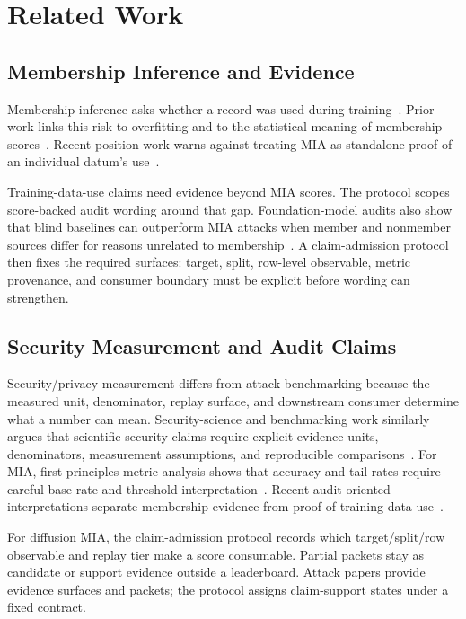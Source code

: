 \documentclass[10pt,conference]{IEEEtran}
\begin{document}
\section{Related Work}

\subsection{Membership Inference and Evidence}

Membership inference asks whether a record was used during training~\cite{shokri2017membership}.
Prior work links this risk to overfitting and to the statistical meaning of
membership scores~\cite{yeom2018privacy,carlini2022firstprinciples}. Recent
position work warns against treating MIA as standalone proof of an individual
datum's use~\cite{zhang2025cannotprove}.

Training-data-use claims need evidence beyond MIA scores. The protocol scopes
score-backed audit wording around that gap.
Foundation-model audits
also show that blind baselines can outperform MIA attacks when member and
nonmember sources differ for reasons unrelated to membership~\cite{das2025blind}.
A claim-admission protocol then fixes the required surfaces: target, split,
row-level observable, metric provenance, and consumer boundary must be explicit
before wording can strengthen.

\subsection{Security Measurement and Audit Claims}

Security/privacy measurement differs from attack benchmarking because the
measured unit, denominator, replay surface, and downstream consumer determine
what a number can mean. Security-science and benchmarking work similarly argues
that scientific security claims require explicit evidence units, denominators,
measurement assumptions, and reproducible comparisons~\cite{herley2017sokscience,vanderkouwe2020benchmarking}.
For MIA, first-principles metric analysis shows that accuracy and tail
rates require careful base-rate and threshold
interpretation~\cite{carlini2022firstprinciples}. Recent audit-oriented
interpretations separate membership evidence from proof of training-data
use~\cite{zhang2025cannotprove}.

For diffusion MIA, the claim-admission protocol records which target/split/row
observable and replay tier make a score consumable. Partial packets stay as
candidate or support evidence outside a leaderboard. Attack papers provide
evidence surfaces and packets; the protocol assigns claim-support states under a
fixed contract.
\end{document}
